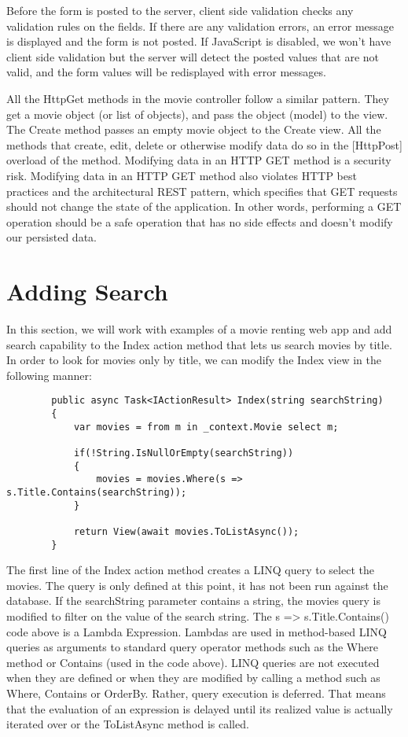 \documentclass{report}
\begin{document}
    Before the form is posted to the server, client side validation checks any validation
    rules on the fields. If there are any validation errors, an error message is displayed
    and the form is not posted. If JavaScript is disabled, we won't have client side
    validation but the server will detect the posted values that are not valid, and the form
    values will be redisplayed with error messages.

    All the HttpGet methods in the movie controller follow a similar pattern. They get a
    movie object (or list of objects), and pass the object (model) to the view. The Create
    method passes an empty movie object to the Create view. All the methods that create, edit,
    delete or otherwise modify data do so in the [HttpPost] overload of the method. Modifying
    data in an HTTP GET method is a security risk. Modifying data in an HTTP GET method also
    violates HTTP best practices and the architectural REST pattern, which specifies that GET
    requests should not change the state of the application. In other words, performing a GET
    operation should be a safe operation that has no side effects and doesn't modify our
    persisted data.

    \chapter{Adding Search}
    In this section, we will work with examples of a movie renting web app and add search
    capability to the Index action method that lets us search movies by title.
    In order to look for movies only by title, we can modify the Index view
    in the following manner:
    \lstset{style=sharpc}
    \begin{lstlisting}
        public async Task<IActionResult> Index(string searchString)
        {
            var movies = from m in _context.Movie select m;

            if(!String.IsNullOrEmpty(searchString))
            {
                movies = movies.Where(s => s.Title.Contains(searchString));
            }

            return View(await movies.ToListAsync());
        }
    \end{lstlisting}

    The first line of the Index action method creates a LINQ query to select
    the movies. The query is only defined at this point, it has not been run
    against the database. If the searchString parameter contains a string, the
    movies query is modified to filter on the value of the search string.
    The s => s.Title.Contains() code above is a Lambda Expression. Lambdas are
    used in method-based LINQ queries as arguments to standard query operator
    methods such as the Where method or Contains (used in the code above). LINQ
    queries are not executed when they are defined or when they are modified by
    calling a method such as Where, Contains or OrderBy. Rather, query execution
    is deferred. That means that the evaluation of an expression is delayed until
    its realized value is actually iterated over or the ToListAsync method is called.
\end{document}
